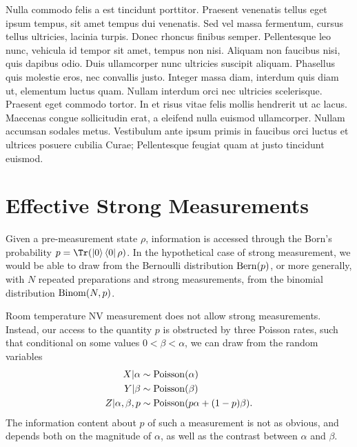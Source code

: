 \documentclass[aps,prl,twocolumn,superscriptaddress]{revtex4}
\begin{document}
Nulla commodo felis a est tincidunt porttitor. Praesent venenatis tellus eget ipsum tempus, sit amet tempus dui venenatis. Sed vel massa fermentum, cursus tellus ultricies, lacinia turpis. Donec rhoncus finibus semper. Pellentesque leo nunc, vehicula id tempor sit amet, tempus non nisi. Aliquam non faucibus nisi, quis dapibus odio. Duis ullamcorper nunc ultricies suscipit aliquam. Phasellus quis molestie eros, nec convallis justo. Integer massa diam, interdum quis diam ut, elementum luctus quam. Nullam interdum orci nec ultricies scelerisque. Praesent eget commodo tortor. In et risus vitae felis mollis hendrerit ut ac lacus. Maecenas congue sollicitudin erat, a eleifend nulla euismod ullamcorper. Nullam accumsan sodales metus. Vestibulum ante ipsum primis in faucibus orci luctus et ultrices posuere cubilia Curae; Pellentesque feugiat quam at justo tincidunt euismod. 


\acknowledgments{
    
}

\nocite{apsrev41Control}




\appendix
\onecolumngrid

\section{Effective Strong Measurements}
\label{apx:effective-strong-measurements}

Given a pre-measurement state $\rho$, information is accessed through the
Born's probability $p=\Tr(\ketbra{0}\rho)$.
In the hypothetical case of strong measurement, we would be able to draw from 
the Bernoulli distribution $\operatorname{Bern}(p)$, or more generally, with 
$N$ repeated preparations and strong measurements, from 
the binomial distribution $\operatorname{Binom}(N,p)$.

Room temperature NV measurement does not allow strong measurements. 
Instead, our access to the quantity $p$ is obstructed by three Poisson rates,
such that conditional on some values $0<\beta<\alpha$, we can 
draw from the random variables
\begin{align}
    X|\alpha &\sim \operatorname{Poisson}(\alpha) \nonumber \\
    Y|\beta &\sim \operatorname{Poisson}(\beta) \nonumber \\
    Z|\alpha,\beta,p &\sim \operatorname{Poisson}(p\alpha + (1-p)\beta).
\end{align}
The information content about $p$ of such a measurement is not as obvious, 
and depends both on the magnitude of $\alpha$, as well as the contrast between 
$\alpha$ and $\beta$.
\end{document}
